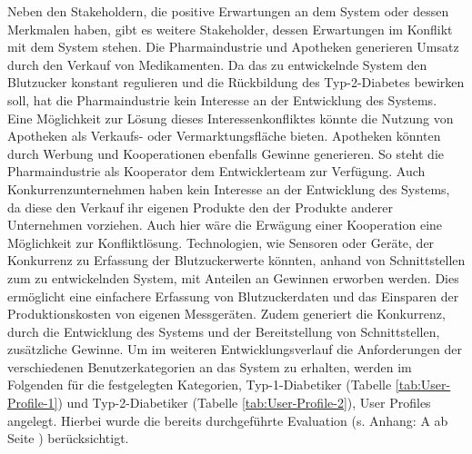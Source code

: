 \documentclass[a4paper,11pt]{article}%
\renewcommand{\\}{\vspace*{0.5\baselineskip} \newline}
\begin{document}
	Neben den Stakeholdern, die positive Erwartungen an dem System oder dessen Merkmalen haben, gibt es weitere Stakeholder, dessen Erwartungen im Konflikt mit dem System stehen. Die Pharmaindustrie und Apotheken generieren Umsatz durch den Verkauf von Medikamenten. Da das zu entwickelnde System den Blutzucker konstant regulieren und die Rückbildung des Typ-2-Diabetes bewirken soll, hat die Pharmaindustrie kein Interesse an der Entwicklung des Systems. Eine Möglichkeit zur Lösung dieses Interessenkonfliktes könnte die Nutzung von Apotheken als Verkaufs- oder Vermarktungsfläche bieten. Apotheken könnten durch Werbung und Kooperationen ebenfalls Gewinne generieren. So steht die Pharmaindustrie als Kooperator dem Entwicklerteam zur Verfügung. Auch Konkurrenzunternehmen haben kein Interesse an der Entwicklung des Systems, da diese den Verkauf ihr eigenen Produkte den der Produkte anderer Unternehmen vorziehen. Auch hier wäre die Erwägung einer Kooperation eine Möglichkeit zur Konfliktlösung. Technologien, wie Sensoren oder Geräte, der Konkurrenz zu Erfassung der Blutzuckerwerte könnten, anhand von Schnittstellen zum zu entwickelnden System, mit Anteilen an Gewinnen erworben werden. Dies ermöglicht eine einfachere Erfassung von Blutzuckerdaten und das Einsparen der Produktionskosten von eigenen Messgeräten. Zudem generiert die Konkurrenz, durch die Entwicklung des Systems und der Bereitstellung von Schnittstellen, zusätzliche Gewinne.\\
	Um im weiteren Entwicklungsverlauf die Anforderungen der verschiedenen Benutzerkategorien an das System zu erhalten, werden im Folgenden für die festgelegten Kategorien, Typ-1-Diabetiker (Tabelle \ref{tab:User-Profile-1}) und Typ-2-Diabetiker (Tabelle \ref{tab:User-Profile-2}), User Profiles angelegt. Hierbei wurde die bereits durchgeführte Evaluation (s. Anhang: A  ab Seite \pageref{section:Evaluation}) berücksichtigt.
\end{document}
